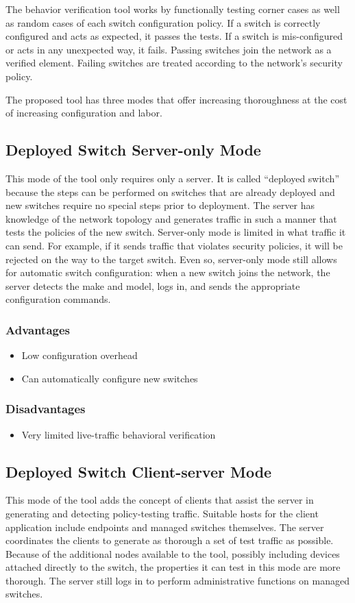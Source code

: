\documentclass[journal]{IEEEtran}
\begin{document}
The behavior verification tool works by functionally testing corner cases as well as random cases
of each switch configuration policy. If a switch is correctly configured and acts as expected, it
passes the tests. If a switch is mis-configured or acts in any unexpected way, it fails. Passing
switches join the network as a verified element. Failing switches are treated according to the
network's security policy.

The proposed tool has three modes that offer increasing thoroughness at the cost of increasing
configuration and labor.

\subsection{Deployed Switch Server-only Mode}
This mode of the tool only requires only a server. It is called ``deployed switch'' because the
steps can be performed on switches that are already deployed and new switches require no special
steps prior to deployment. The server has knowledge of
the network topology and generates traffic in such a manner that tests the policies of the new
switch. Server-only mode is limited in what traffic it can send. For example, if it sends traffic
that violates security policies, it will be rejected on the way to the target switch.
Even so, server-only mode still allows for automatic switch configuration: when a new switch
joins the network, the server detects the make and model, logs in, and sends the appropriate
configuration commands.
\subsubsection{Advantages}
\begin{itemize}
	\item Low configuration overhead
	\item Can automatically configure new switches
\end{itemize}
\subsubsection{Disadvantages}
\begin{itemize}
	\item Very limited live-traffic behavioral verification
\end{itemize}

\subsection{Deployed Switch Client-server Mode}
This mode of the tool adds the concept of clients that assist the server in generating and detecting
policy-testing traffic. Suitable hosts for the client application include endpoints and managed
switches themselves. The server coordinates the clients to generate as thorough a set of test
traffic as possible. Because of the additional nodes available to the tool, possibly including
devices
attached directly to the switch, the properties it can test in this mode are more thorough. The
server still logs in to perform administrative functions on managed switches.
\end{document}
